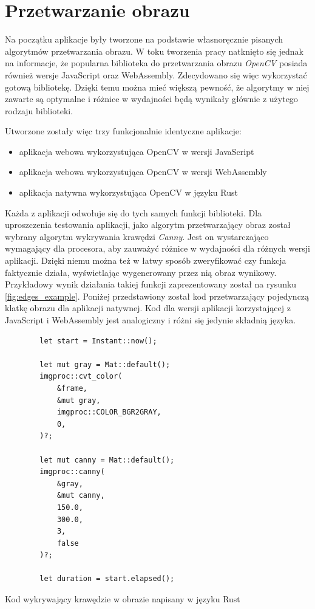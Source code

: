 \documentclass[language=polish,type=master]{aghmodern}
\begin{document}
\section{Przetwarzanie obrazu}
Na początku aplikacje były tworzone na podstawie własnoręcznie pisanych algorytmów przetwarzania obrazu.
W toku tworzenia pracy natknięto się jednak na informacje, że popularna biblioteka do przetwarzania obrazu \emph{OpenCV}\footnotemark{} posiada również wersje JavaScript oraz WebAssembly.
Zdecydowano się więc wykorzystać gotową bibliotekę.
Dzięki temu można mieć większą pewność, że algorytmy w niej zawarte są optymalne i różnice w wydajności będą wynikały głównie z użytego rodzaju biblioteki.

Utworzone zostały więc trzy funkcjonalnie identyczne aplikacje:
\begin{itemize}
    \item aplikacja webowa wykorzystująca OpenCV w wersji JavaScript
    \item aplikacja webowa wykorzystująca OpenCV w wersji WebAssembly
    \item aplikacja natywna wykorzystująca OpenCV w języku Rust
\end{itemize}

Każda z aplikacji odwołuje się do tych samych funkcji biblioteki.
Dla uproszczenia testowania aplikacji, jako algorytm przetwarzający obraz został wybrany algorytm wykrywania krawędzi \emph{Canny}\footnotemark{}.
Jest on wystarczająco wymagający dla procesora, aby zauważyć różnice w wydajności dla różnych wersji aplikacji.
Dzięki niemu można też w łatwy sposób zweryfikować czy funkcja faktycznie działa, wyświetlając wygenerowany przez nią obraz wynikowy.
Przykładowy wynik działania takiej funkcji zaprezentowany został na rysunku \ref{fig:edges_example}.
Poniżej przedstawiony został kod przetwarzający pojedynczą klatkę obrazu dla aplikacji natywnej.
Kod dla wersji aplikacji korzystającej z JavaScript i WebAssembly jest analogiczny i różni się jedynie składnią języka.

\begin{listing}[H]
    \begin{verbatim}
        let start = Instant::now();

        let mut gray = Mat::default();
        imgproc::cvt_color(
            &frame,
            &mut gray,
            imgproc::COLOR_BGR2GRAY,
            0,
        )?;

        let mut canny = Mat::default();
        imgproc::canny(
            &gray,
            &mut canny,
            150.0,
            300.0,
            3,
            false
        )?;

        let duration = start.elapsed();
    \end{verbatim}
    \caption{Kod wykrywający krawędzie w obrazie napisany w języku Rust}
\end{listing}
\end{document}
